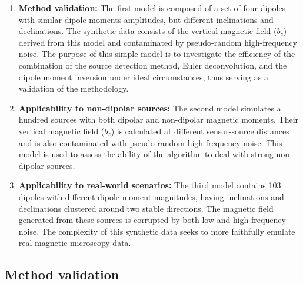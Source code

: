 \begin{enumerate}
\item \textbf{Method validation:}
The first model is composed of a set of four dipoles with similar dipole moments amplitudes, but different inclinations and declinations.
The synthetic data consists of the vertical magnetic field ($b_z$) derived from this model and contaminated by pseudo-random high-frequency noise.
The purpose of this simple model is to investigate the efficiency of the combination of the source detection method, Euler deconvolution, and the dipole moment inversion under ideal circumstances, thus serving as a validation of the methodology.

\item \textbf{Applicability to non-dipolar sources:}
The second model simulates a hundred sources with both dipolar and non-dipolar magnetic moments.
Their vertical magnetic field ($b_z$) is calculated at different sensor-source distances
and is also contaminated with pseudo-random high-frequency noise.
This model is used to assess the ability of the algorithm to deal with strong non-dipolar sources.

\item \textbf{Applicability to real-world scenarios:}
The third model contains 103 dipoles with different dipole moment magnitudes, having inclinations and declinations clustered around two stable directions.
The magnetic field generated from these sources is corrupted by both low and high-frequency noise.
The complexity of this synthetic data seeks to more faithfully emulate real magnetic microscopy data.
\end{enumerate}

\subsection{Method validation}


